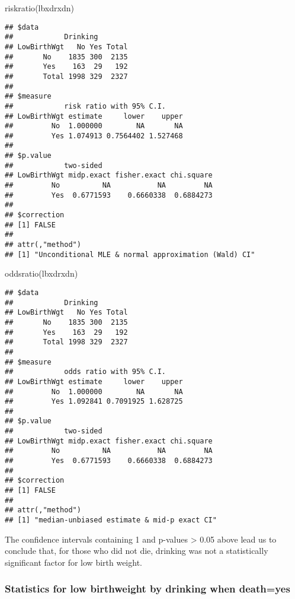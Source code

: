 \documentclass[
]{article}
\newenvironment{Shaded}{\begin{snugshade}}{\end{snugshade}}
\newcommand{\FunctionTok}[1]{\textcolor[rgb]{0.00,0.00,0.00}{#1}}
\newcommand{\NormalTok}[1]{#1}
\begin{document}
\begin{Shaded}
\begin{Highlighting}[]
\FunctionTok{riskratio}\NormalTok{(lbxdrxdn)}
\end{Highlighting}
\end{Shaded}

\begin{verbatim}
## $data
##            Drinking
## LowBirthWgt   No Yes Total
##       No    1835 300  2135
##       Yes    163  29   192
##       Total 1998 329  2327
## 
## $measure
##            risk ratio with 95% C.I.
## LowBirthWgt estimate     lower    upper
##         No  1.000000        NA       NA
##         Yes 1.074913 0.7564402 1.527468
## 
## $p.value
##            two-sided
## LowBirthWgt midp.exact fisher.exact chi.square
##         No          NA           NA         NA
##         Yes  0.6771593    0.6660338  0.6884273
## 
## $correction
## [1] FALSE
## 
## attr(,"method")
## [1] "Unconditional MLE & normal approximation (Wald) CI"
\end{verbatim}

\begin{Shaded}
\begin{Highlighting}[]
\FunctionTok{oddsratio}\NormalTok{(lbxdrxdn)}
\end{Highlighting}
\end{Shaded}

\begin{verbatim}
## $data
##            Drinking
## LowBirthWgt   No Yes Total
##       No    1835 300  2135
##       Yes    163  29   192
##       Total 1998 329  2327
## 
## $measure
##            odds ratio with 95% C.I.
## LowBirthWgt estimate     lower    upper
##         No  1.000000        NA       NA
##         Yes 1.092841 0.7091925 1.628725
## 
## $p.value
##            two-sided
## LowBirthWgt midp.exact fisher.exact chi.square
##         No          NA           NA         NA
##         Yes  0.6771593    0.6660338  0.6884273
## 
## $correction
## [1] FALSE
## 
## attr(,"method")
## [1] "median-unbiased estimate & mid-p exact CI"
\end{verbatim}

The confidence intervals containing 1 and p-values \textgreater{} 0.05
above lead us to conclude that, for those who did not die, drinking was
not a statistically significant factor for low birth weight.

\hypertarget{statistics-for-low-birthweight-by-drinking-when-deathyes}{%
\subsubsection{Statistics for low birthweight by drinking when
death=yes}\label{statistics-for-low-birthweight-by-drinking-when-deathyes}}
\end{document}
